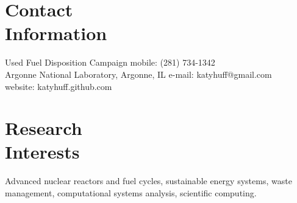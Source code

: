 \documentclass[margin,line]{resume}
\begin{document}
\begin{resume}

    \section{\mysidestyle Contact\\Information}

    Used Fuel Disposition Campaign                          \hfill mobile: (281) 734-1342           \vspace{0mm}\\\vspace{0mm}%
    Argonne National Laboratory, Argonne, IL                \hfill e-mail: katyhuff@gmail.com            \vspace{0mm}\\\vspace{0mm}%
                                                            \hfill website: katyhuff.github.com     \vspace{0mm}\\\vspace{-4.5mm}%
    \vspace{-3mm}
    \section{\mysidestyle Research\\Interests}
		Advanced nuclear reactors and fuel cycles, sustainable energy systems, waste 
                management, computational systems analysis, scientific 
                computing.%
    

\end{resume}
\end{document}
